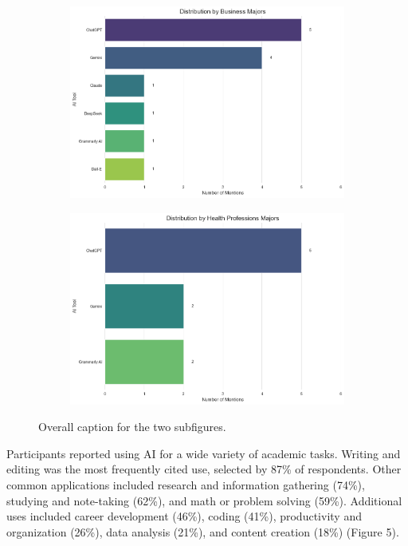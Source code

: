 \documentclass[12pt]{article}
\begin{document}
\begin{figure}[H]
\begin{subfigure}[b]{0.45\textwidth}
    \includegraphics[width=\textwidth]{fig4-3.png} %
    \label{fig:subfig1b}
  \end{subfigure}
  \hfill %
  \begin{subfigure}[b]{0.45\textwidth}
    \includegraphics[width=\textwidth]{fig4-4.png} %
    \label{fig:subfig1b}
  \end{subfigure}
  \caption{Overall caption for the two subfigures.}
  \label{fig:subfigures1}
\end{figure}


Participants reported using AI for a wide variety of academic tasks. Writing and editing was the most frequently cited use, selected by 87\% of respondents. Other common applications included research and information gathering (74\%), studying and note-taking (62\%), and math or problem solving (59\%). Additional uses included career development (46\%), coding (41\%), productivity and organization (26\%), data analysis (21\%), and content creation (18\%) (Figure 5).
\end{document}
